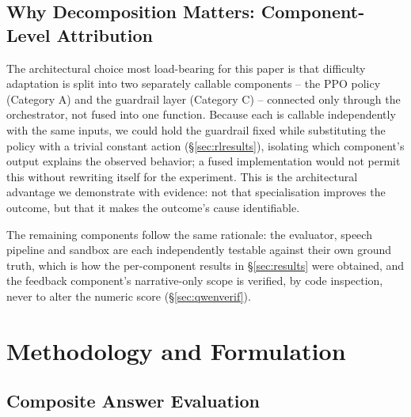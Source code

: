 \documentclass[conference]{IEEEtran}
\begin{document}
\subsection{Why Decomposition Matters: Component-Level Attribution}

The architectural choice most load-bearing for this paper is that difficulty adaptation is split into two separately callable components -- the PPO policy (Category A) and the guardrail layer (Category C) -- connected only through the orchestrator, not fused into one function. Because each is callable independently with the same inputs, we could hold the guardrail fixed while substituting the policy with a trivial constant action (\S\ref{sec:rlresults}), isolating which component's output explains the observed behavior; a fused implementation would not permit this without rewriting itself for the experiment. This is the architectural advantage we demonstrate with evidence: not that specialisation improves the outcome, but that it makes the outcome's cause identifiable.

The remaining components follow the same rationale: the evaluator, speech pipeline and sandbox are each independently testable against their own ground truth, which is how the per-component results in \S\ref{sec:results} were obtained, and the feedback component's narrative-only scope is verified, by code inspection, never to alter the numeric score (\S\ref{sec:qwenverif}).

\section{Methodology and Formulation}

\subsection{Composite Answer Evaluation}
\label{sec:eval}
\end{document}
